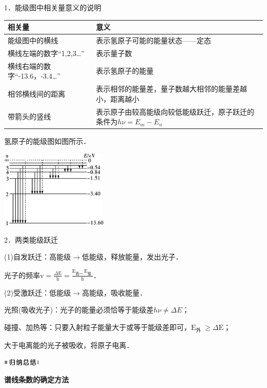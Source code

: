 1．能级图中相关量意义的说明

\begin{longtable}[]{@{}m{5cm}m{7cm}@{}}
\toprule
相关量 & 意义\tabularnewline
\midrule
\endhead
能级图中的横线 & 表示氢原子可能的能量状态------定态\tabularnewline
横线左端的数字``1,2,3\ldots'' & 表示量子数\tabularnewline
横线右端的数字``-13.6，-3.4\ldots'' & 表示氢原子的能量\tabularnewline
相邻横线间的距离 &
表示相邻的能量差，量子数越大相邻的能量差越小，距离越小\tabularnewline
带箭头的竖线 &
表示原子由较高能级向较低能级跃迁，原子跃迁的条件为$h\nu=E_m-E_n$\tabularnewline
\bottomrule
\end{longtable}

氢原子的能级图如图所示．

\begin{center}\includegraphics[width=2.00972in,height=1.45278in]{media/image478.png}\end{center}

2．两类能级跃迁

(1)自发跃迁：高能级$\rightarrow$低能级，释放能量，发出光子．

光子的频率$\mathrm{v}=\frac{\Delta \mathrm{E}}{\mathrm{h}}=\frac{\mathrm{E}_{\text {高一 }} \mathrm{E}_{\text {低 }}}{\mathrm{h}}$．

(2)受激跃迁：低能级$\rightarrow$高能级，吸收能量．

光照(吸收光子)：光子的能量必须恰等于能级差$h\nu\neq\Delta E$；

碰撞、加热等：只要入射粒子能量大于或等于能级差即可，$\mathrm{E}_{\text {外 }} \geqslant \Delta \mathrm{E}$；

大于电离能的光子被吸收，将原子电离．

\begin{center}\includegraphics[width=0.70764in,height=0.12292in]{media/image13.png}\end{center}
\begin{center}
    \textbf{谱线条数的确定方法}
\end{center}

